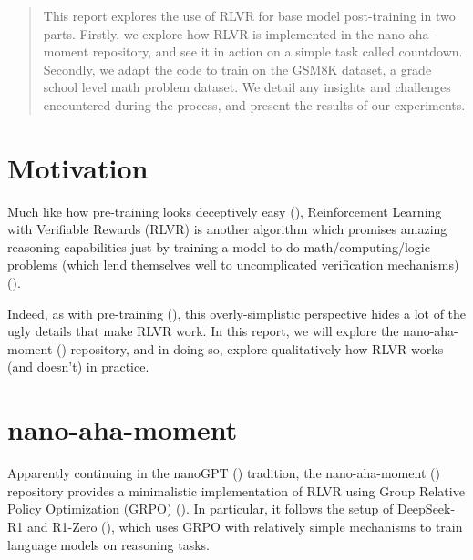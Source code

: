 \documentclass{article} %
\theoremstyle{definition}
\begin{document}
\begin{abstract}
    This report explores the use of RLVR for base model post-training in two parts.
    Firstly, we explore how RLVR is implemented in the nano-aha-moment repository, and see it in action
    on a simple task called countdown.
    Secondly, we adapt the code to train on the GSM8K dataset, a grade school level math problem dataset.
    We detail any insights and challenges encountered during the process,
    and present the results of our experiments.
\end{abstract}

\section{Motivation}

Much like how pre-training looks deceptively easy (\cite{beh-2025-b}),
Reinforcement Learning with Verifiable Rewards (RLVR) is another algorithm
which promises amazing reasoning capabilities just by training a model to do 
math/computing/logic problems (which lend themselves well to uncomplicated verification mechanisms) 
(\cite{grpo, r1, tulu3}).

Indeed, as with pre-training (\cite{beh-2025-b}), this overly-simplistic perspective hides 
a lot of the ugly details that make RLVR work.
In this report, we will explore the nano-aha-moment (\cite{nano-aha-moment}) repository,
and in doing so, explore qualitatively how RLVR works (and doesn't) in practice.

\section{nano-aha-moment}
Apparently continuing in the nanoGPT (\cite{nanoGPT}) tradition,
the nano-aha-moment (\cite{nano-aha-moment}) repository provides a minimalistic implementation 
of RLVR using Group Relative Policy Optimization (GRPO) (\cite{grpo}).
In particular, it follows the setup of DeepSeek-R1 and R1-Zero (\cite{r1}),
which uses GRPO with relatively simple mechanisms to train language models on reasoning tasks.
\end{document}
